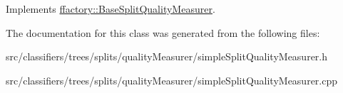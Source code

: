 Implements \hyperlink{classffactory_1_1_base_split_quality_measurer_a64904410d1071ba5aaa6928f0ea7f1a5}{ffactory\-::\-Base\-Split\-Quality\-Measurer}.



The documentation for this class was generated from the following files\-:\begin{DoxyCompactItemize}
\item 
src/classifiers/trees/splits/quality\-Measurer/simple\-Split\-Quality\-Measurer.\-h\item 
src/classifiers/trees/splits/quality\-Measurer/simple\-Split\-Quality\-Measurer.\-cpp\end{DoxyCompactItemize}
